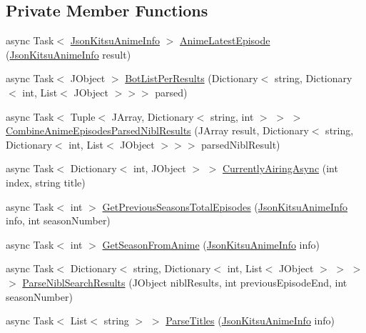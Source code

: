 \subsection*{Private Member Functions}
\begin{DoxyCompactItemize}
\item 
async Task$<$ \mbox{\hyperlink{class_little_weeb_library_1_1_models_1_1_json_kitsu_anime_info}{Json\+Kitsu\+Anime\+Info}} $>$ \mbox{\hyperlink{class_little_weeb_library_1_1_handlers_1_1_anime_profile_handler_a2f28ad03d4dfe8d90c0392da8af39651}{Anime\+Latest\+Episode}} (\mbox{\hyperlink{class_little_weeb_library_1_1_models_1_1_json_kitsu_anime_info}{Json\+Kitsu\+Anime\+Info}} result)
\item 
async Task$<$ J\+Object $>$ \mbox{\hyperlink{class_little_weeb_library_1_1_handlers_1_1_anime_profile_handler_a1bb944a0f0871b23484be89e2cf8705f}{Bot\+List\+Per\+Results}} (Dictionary$<$ string, Dictionary$<$ int, List$<$ J\+Object $>$$>$$>$ parsed)
\item 
async Task$<$ Tuple$<$ J\+Array, Dictionary$<$ string, int $>$ $>$ $>$ \mbox{\hyperlink{class_little_weeb_library_1_1_handlers_1_1_anime_profile_handler_a132e4da0f082cc2c967cd06eaac3337b}{Combine\+Anime\+Episodes\+Parsed\+Nibl\+Results}} (J\+Array result, Dictionary$<$ string, Dictionary$<$ int, List$<$ J\+Object $>$$>$$>$ parsed\+Nibl\+Result)
\item 
async Task$<$ Dictionary$<$ int, J\+Object $>$ $>$ \mbox{\hyperlink{class_little_weeb_library_1_1_handlers_1_1_anime_profile_handler_a11b3560a1e2fe0e3ac5d481efb46d7a6}{Currently\+Airing\+Async}} (int index, string title)
\item 
async Task$<$ int $>$ \mbox{\hyperlink{class_little_weeb_library_1_1_handlers_1_1_anime_profile_handler_a4fc9722b5a07b62c081a75873934682e}{Get\+Previous\+Seasons\+Total\+Episodes}} (\mbox{\hyperlink{class_little_weeb_library_1_1_models_1_1_json_kitsu_anime_info}{Json\+Kitsu\+Anime\+Info}} info, int season\+Number)
\item 
async Task$<$ int $>$ \mbox{\hyperlink{class_little_weeb_library_1_1_handlers_1_1_anime_profile_handler_ad7341acd9da86cd5cee9a45b0a41f887}{Get\+Season\+From\+Anime}} (\mbox{\hyperlink{class_little_weeb_library_1_1_models_1_1_json_kitsu_anime_info}{Json\+Kitsu\+Anime\+Info}} info)
\item 
async Task$<$ Dictionary$<$ string, Dictionary$<$ int, List$<$ J\+Object $>$ $>$ $>$ $>$ \mbox{\hyperlink{class_little_weeb_library_1_1_handlers_1_1_anime_profile_handler_a92412693abdf9ea697e6b793b71d468f}{Parse\+Nibl\+Search\+Results}} (J\+Object nibl\+Results, int previous\+Episode\+End, int season\+Number)
\item 
async Task$<$ List$<$ string $>$ $>$ \mbox{\hyperlink{class_little_weeb_library_1_1_handlers_1_1_anime_profile_handler_a4796da2a058bbc1efe2ee8f31b6a9b4d}{Parse\+Titles}} (\mbox{\hyperlink{class_little_weeb_library_1_1_models_1_1_json_kitsu_anime_info}{Json\+Kitsu\+Anime\+Info}} info)
\end{DoxyCompactItemize}
